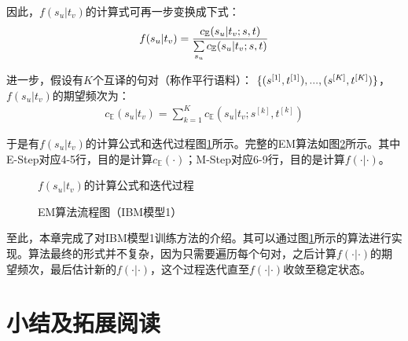 \parinterval 因此，$f(s_u|t_v)$的计算式可再一步变换成下式：
\begin{eqnarray}
f(s_u|t_v)=\frac{c_{\mathbb{E}}(s_u|t_v;{s},{t})}  { \sum\limits_{s_u} c_{\mathbb{E}}(s_u|t_v;{s},{t}) }
\label{eq:5-45}
\end{eqnarray}



\parinterval 进一步，假设有$K$个互译的句对（称作平行语料）：
$\{({s}^{[1]},{t}^{[1]}),...,({s}^{[K]},{t}^{[K]})\}$，$f(s_u|t_v)$的期望频次为：
\begin{eqnarray}
c_{\mathbb{E}}(s_u|t_v)=\sum\limits_{k=1}^{K}  c_{\mathbb{E}}(s_u|t_v;s^{[k]},t^{[k]})
\label{eq:5-46}
\end{eqnarray}

\parinterval 于是有$f(s_u|t_v)$的计算公式和迭代过程图\ref{fig:5-27}所示。完整的EM算法如图\ref{fig:5-28}所示。其中E-Step对应4-5行，目的是计算$c_{\mathbb{E}}(\cdot)$；M-Step对应6-9行，目的是计算$f(\cdot|\cdot)$。

\begin{figure}[htp]
    \centering

   \caption{$f(s_u|t_v)$的计算公式和迭代过程}
   \label{fig:5-27}
\end{figure}

\begin{figure}[htp]
    \centering
    
   \caption{EM算法流程图（IBM模型1）}
   \label{fig:5-28}
\end{figure}

\parinterval 至此，本章完成了对IBM模型1训练方法的介绍。其可以通过图\ref{fig:5-27}所示的算法进行实现。算法最终的形式并不复杂，因为只需要遍历每个句对，之后计算$f(\cdot|\cdot)$的期望频次，最后估计新的$f(\cdot|\cdot)$，这个过程迭代直至$f(\cdot|\cdot)$收敛至稳定状态。

\vspace{-1.5em}




\sectionnewpage
\section{小结及拓展阅读}

